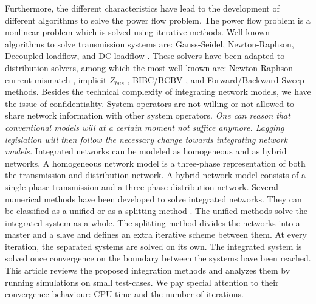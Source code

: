 \documentclass[10pt,journal]{article}
\begin{document}
Furthermore, the different characteristics have lead to the development of different algorithms to solve the power flow problem. The power flow problem is a nonlinear problem which is solved using iterative methods. Well-known algorithms to solve transmission systems are: Gauss-Seidel, Newton-Raphson, Decoupled loadflow, and DC loadflow \cite{Schavemaker2008chap6}. These solvers have been adapted to distribution solvers, among which the most well-known are: Newton-Raphson current mismatch \cite{Garcia2000}\cite{Abdel-akher2005}, implicit $Z_{bus}$ \cite{Teng2002a}\cite{Chen1991a}, BIBC/BCBV \cite{Teng2008}\cite{Farag2011}, and Forward/Backward Sweep \cite{Moghaddas2009}\cite{Eminoglu2008} methods. Besides the technical complexity of integrating network models, we have the issue of confidentiality. System operators are not willing or not allowed to share network information with other system operators. \textit{One can reason that conventional models will at a certain moment not suffice anymore. Lagging legislation will then follow the necessary change towards integrating network models. 
}\newline\newline 
Integrated networks can be modeled as homogeneous and as hybrid networks. A homogeneous network model is a three-phase representation of both the transmission and distribution network. A hybrid network model consists of a single-phase transmission and a three-phase distribution network. Several numerical methods have been developed to solve integrated networks. They can be classified as a unified \cite{Taranto2008} or as a splitting method \cite{Sun2005}.  The unified methods solve the integrated system as a whole. The splitting method divides the networks into a master and a slave and defines an extra iterative scheme between them. At every iteration, the separated systems are solved on its own. The integrated system is solved once convergence on the boundary between the systems have been reached. This article reviews the proposed integration methods and analyzes them by running simulations on small test-cases. We pay special attention to their convergence behaviour: CPU-time and the number of iterations. 
\end{document}
